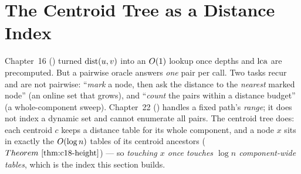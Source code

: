\section{The Centroid Tree as a Distance Index}\label{sec:c18-index}

\begin{previouslybox}
Chapter~16 () turned \(\operatorname{dist}(u,v)\) into an \(O(1)\) lookup once
depths and \(\operatorname{lca}\) are precomputed. But a pairwise oracle answers \emph{one} pair per
call. Two tasks recur and are not pairwise: ``\emph{mark} a node, then ask the distance
to the \emph{nearest} marked node'' (an online set that grows), and ``\emph{count} the
pairs within a distance budget'' (a whole-component sweep). Chapter~22 ()
handles a fixed path's \emph{range}; it does not index a dynamic set and cannot
enumerate all pairs. The centroid tree does: each centroid \(c\) keeps a distance table
for its whole component, and a node \(x\) sits in exactly the \(O(\log n)\) tables
of its centroid ancestors (\(\thmref{c18-height}\)) --- so \emph{touching \(x\) once
touches \(\log n\) component-wide tables}, which is the index this section builds.
\end{previouslybox}

